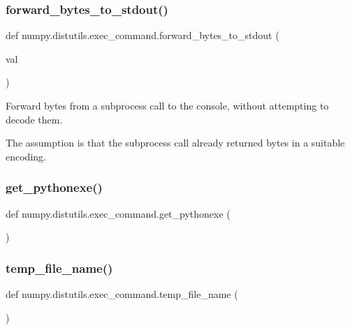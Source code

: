 \subsubsection{\texorpdfstring{forward\+\_\+bytes\+\_\+to\+\_\+stdout()}{forward\_bytes\_to\_stdout()}}
{\footnotesize\ttfamily def numpy.\+distutils.\+exec\+\_\+command.\+forward\+\_\+bytes\+\_\+to\+\_\+stdout (\begin{DoxyParamCaption}\item[{}]{val }\end{DoxyParamCaption})}

\begin{DoxyVerb}Forward bytes from a subprocess call to the console, without attempting to
decode them.

The assumption is that the subprocess call already returned bytes in
a suitable encoding.
\end{DoxyVerb}
 \mbox{\label{namespacenumpy_1_1distutils_1_1exec__command_a12ae23b81b1ba23d159bb59baaff0db7}} 
\subsubsection{\texorpdfstring{get\+\_\+pythonexe()}{get\_pythonexe()}}
{\footnotesize\ttfamily def numpy.\+distutils.\+exec\+\_\+command.\+get\+\_\+pythonexe (\begin{DoxyParamCaption}{ }\end{DoxyParamCaption})}

\mbox{\label{namespacenumpy_1_1distutils_1_1exec__command_a872f1dcbe44528dfbad63400c2e751ae}} 
\subsubsection{\texorpdfstring{temp\+\_\+file\+\_\+name()}{temp\_file\_name()}}
{\footnotesize\ttfamily def numpy.\+distutils.\+exec\+\_\+command.\+temp\+\_\+file\+\_\+name (\begin{DoxyParamCaption}{ }\end{DoxyParamCaption})}

